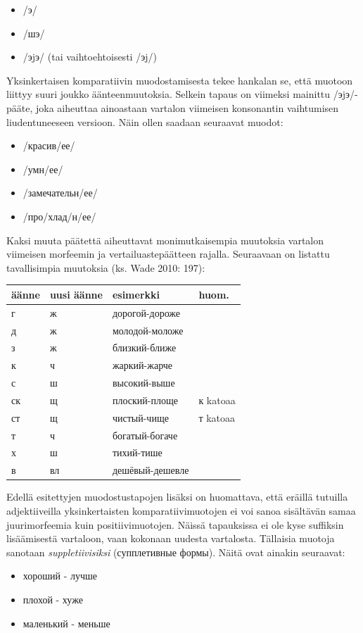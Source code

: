 \documentclass[]{scrartcl}
\providecommand{\tightlist}{%
  \setlength{\itemsep}{0pt}\setlength{\parskip}{0pt}}
\begin{document}
\begin{itemize}
\tightlist
\item
  /э/
\item
  /шэ/
\item
  /эjэ/ (tai vaihtoehtoisesti /эj/)
\end{itemize}

Yksinkertaisen komparatiivin muodostamisesta tekee hankalan se, että
muotoon liittyy suuri joukko äänteenmuutoksia. Selkein tapaus on
viimeksi mainittu /эjэ/-pääte, joka aiheuttaa ainoastaan vartalon
viimeisen konsonantin vaihtumisen liudentuneeseen versioon. Näin ollen
saadaan seuraavat muodot:

\begin{itemize}
\tightlist
\item
  /красив/ее/
\item
  /умн/ее/
\item
  /замечательн/ее/
\item
  /про/хлад/н/ее/
\end{itemize}

Kaksi muuta päätettä aiheuttavat monimutkaisempia muutoksia vartalon
viimeisen morfeemin ja vertailuastepäätteen rajalla. Seuraavaan on
listattu tavallisimpia muutoksia (ks. Wade 2010: 197):

\begin{longtable}[c]{@{}llll@{}}
\toprule
äänne & uusi äänne & esimerkki & huom.\tabularnewline
\midrule
\endhead
г & ж & дорогой-дороже &\tabularnewline
д & ж & молодой-моложе &\tabularnewline
з & ж & близкий-ближе &\tabularnewline
к & ч & жаркий-жарче &\tabularnewline
с & ш & высокий-выше &\tabularnewline
ск & щ & плоский-площе & к katoaa\tabularnewline
ст & щ & чистый-чище & т katoaa\tabularnewline
т & ч & богатый-богаче &\tabularnewline
х & ш & тихий-тише &\tabularnewline
в & вл & дешёвый-дешевле &\tabularnewline
\bottomrule
\end{longtable}

Edellä esitettyjen muodostustapojen lisäksi on huomattava, että eräillä
tutuilla adjektiiveilla yksinkertaisten komparatiivimuotojen ei voi
sanoa sisältävän samaa juurimorfeemia kuin positiivimuotojen. Näissä
tapauksissa ei ole kyse suffiksin lisäämisestä vartaloon, vaan kokonaan
uudesta vartalosta. Tällaisia muotoja sanotaan \emph{suppletiivisiksi}
(супплетивные формы). Näitä ovat ainakin seuraavat:

\begin{itemize}
\tightlist
\item
  хороший - лучше
\item
  плохой - хуже
\item
  маленький - меньше
\end{itemize}
\end{document}

